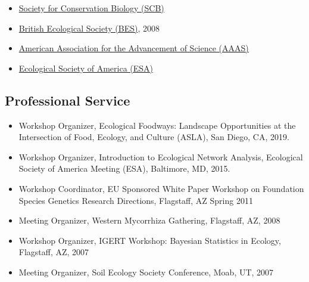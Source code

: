 \documentclass[a4paper]{article}
\begin{document}
\begin{itemize}
\item
  \href{http://www.conbio.org/}{Society for Conservation Biology
  (SCB)}
\item
  \href{http://www.aaas.org/}{British Ecological Society (BES)}, 2008
\item
  \href{http://www.aaas.org/}{American Association for the Advancement
  of Science (AAAS)}
\item
  \href{http://www.esa.org/}{Ecological Society of America (ESA)}
\end{itemize}


\subsection{Professional Service}\label{professional-service}

\begin{itemize}
\item 
  Workshop Organizer, Ecological Foodways: Landscape Opportunities at
  the Intersection of Food, Ecology, and Culture (ASLA), San Diego,
  CA, 2019.
\item 
  Workshop Organizer, Introduction to Ecological Network Analysis,
  Ecological Society of America Meeting (ESA), Baltimore, MD, 2015.
\item
  Workshop Coordinator, EU Sponsored White Paper Workshop on Foundation
  Species Genetics Research Directions, Flagstaff, AZ Spring 2011
\item
  Meeting Organizer, Western Mycorrhiza Gathering, Flagstaff, AZ, 2008
\item
  Workshop Organizer, IGERT Workshop: Bayesian Statistics in Ecology,
  Flagstaff, AZ, 2007
\item
  Meeting Organizer, Soil Ecology Society Conference, Moab, UT, 2007
\end{itemize}
\end{document}
